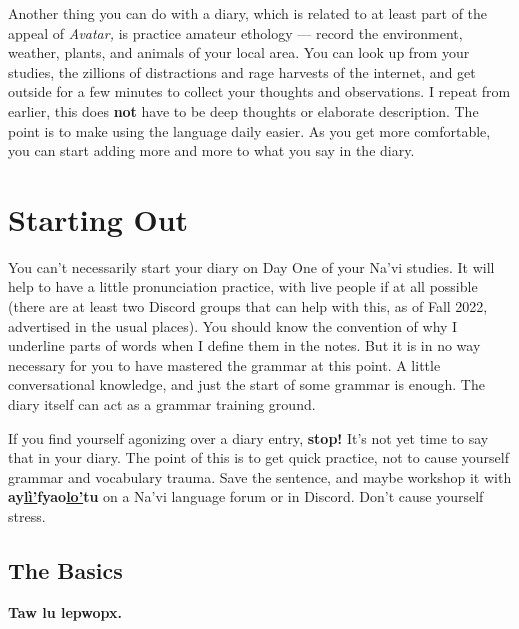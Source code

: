 \documentclass[nofonts]{tufte-handout}
\newcommand{\N}[1]{\textbf{\textcolor{navi}{#1}}}
\begin{document}
Another thing you can do with a diary, which is related to at least
part of the appeal of \textit{Avatar,} is practice amateur ethology —
record the environment, weather, plants, and animals of your local
area.  You can look up from your studies, the zillions of distractions
and rage harvests of the internet, and get outside for a few minutes to
collect your thoughts and observations.  
I repeat from earlier, this does \textbf{not} have to be deep thoughts
or elaborate description.  The point is to make using the language
daily easier.  As you get more comfortable, you can start adding more
and more to what you say in the diary.


\section*{Starting Out}

You can't necessarily start your diary on Day One of your Na'vi
studies.  It will help to have a little pronunciation practice, with
live people if at all possible (there are at least two Discord groups
that can help with this, as of Fall 2022, advertised in the usual
places).  You should know the
convention of why I underline parts of words when I define them in the
notes.  But it is in no way necessary for you to have mastered the
grammar at this point.   A little
conversational knowledge, and just the start of some grammar is
enough.  The diary itself can act as a grammar training ground.

If you find yourself agonizing over a diary entry, \textbf{stop!}
It's not yet time to say that in your diary.  The point of this is to
get quick practice, not to cause yourself grammar and vocabulary
trauma.  Save the sentence, and maybe workshop it with
\N{ay\uline{lì'}fyao\uline{lo'}tu} on a Na'vi language forum or in
Discord.  Don't cause yourself stress.

\subsection*{The Basics}
\N{Taw lu lepwopx.}\marginnote{\N{taw}: ``sky;'' \N{lu}: ``be;''
  \N{lep\uline{wopx}}: ``cloudy.''  \textit{It's cloudy.}}
\end{document}
